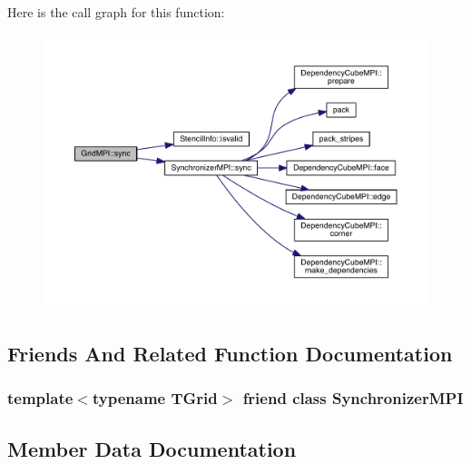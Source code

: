 Here is the call graph for this function\+:\nopagebreak
\begin{figure}[H]
\begin{center}
\leavevmode
\includegraphics[width=350pt]{d9/d3c/class_grid_m_p_i_adbd8d6fb9ec2dd16e9a8317fa573d000_cgraph}
\end{center}
\end{figure}




\subsection{Friends And Related Function Documentation}
\hypertarget{class_grid_m_p_i_a4d6cf8eb005be8cd74ca25544993aca2}{}
\subsubsection[{Synchronizer\+M\+P\+I}]{\setlength{\rightskip}{0pt plus 5cm}template$<$typename T\+Grid$>$ friend class {\bf Synchronizer\+M\+P\+I}\hspace{0.3cm}{\ttfamily [friend]}}\label{class_grid_m_p_i_a4d6cf8eb005be8cd74ca25544993aca2}


\subsection{Member Data Documentation}
\hypertarget{class_grid_m_p_i_a9c0c291e8619844c31afa37d884e7805}{}
